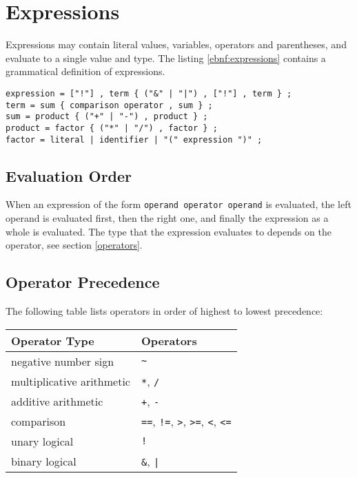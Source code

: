 \documentclass[a4paper,appendixprefix]{scrreprt}
\begin{document}
\chapter{Expressions}\label{expressions}
Expressions may contain literal values, variables, operators and parentheses, and evaluate to a single value and type. The listing \ref{ebnf:expressions} contains a grammatical definition of expressions.

\begin{lstlisting}[label={ebnf:expressions},caption={Expressions Grammar}]
expression = ["!"] , term { ("&" | "|") , ["!"] , term } ;
term = sum { comparison operator , sum } ;
sum = product { ("+" | "-") , product } ;
product = factor { ("*" | "/") , factor } ;
factor = literal | identifier | "(" expression ")" ;
\end{lstlisting}

\section{Evaluation Order}
When an expression of the form \texttt{operand operator operand} is evaluated, the left operand is evaluated first, then the right one, and finally the expression as a whole is evaluated. The type that the expression evaluates to depends on the operator, see section \ref{operators}.

\section{Operator Precedence}
The following table lists operators in order of highest to lowest precedence:

\begin{center}
  \begin{tabularx}{\textwidth}{|X|X|}
    \hline
    \textbf{Operator Type} & \textbf{Operators} \\ \hline
    negative number sign & \verb|~| \\ \hline
    multiplicative arithmetic & \verb|*|, \verb|/| \\ \hline
    additive arithmetic & \verb|+|, \verb|-| \\ \hline
    comparison & \verb|==|, \verb|!=|, \verb|>|, \verb|>=|, \verb|<|, \verb|<=| \\ \hline
    unary logical & \verb|!| \\ \hline
    binary logical & \verb|&|, \texttt{|} \\ \hline
  \end{tabularx}
\end{center}
\end{document}
